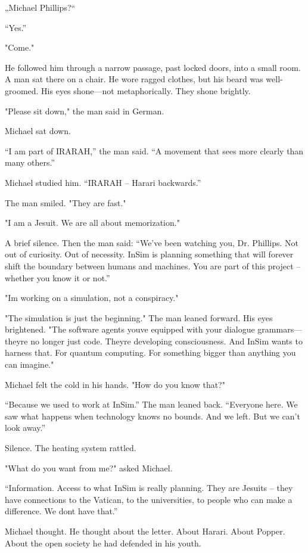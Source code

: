 \documentclass[
]{article}
\begin{document}
„Michael Phillips?{\kern0pt}``

``Yes.''

"Come."

He followed him through a narrow passage, past locked doors, into a small room. A man sat there on a chair. He wore ragged clothes, but his beard was well-groomed. His eyes shone---not metaphorically. They shone brightly.

"Please sit down," the man said in German.

Michael sat down.

``I am part of IRARAH,'' the man said. ``A movement that sees more clearly than many others.''

Michael studied him. ``IRARAH -- Harari backwards.''

The man smiled. "They are fast."

"I am a Jesuit. We are all about memorization."

A brief silence. Then the man said: ``We've been watching you, Dr. Phillips. Not out of curiosity. Out of necessity. InSim is planning something that will forever shift the boundary between humans and machines. You are part of this project -- whether you know it or not.''

"I\textquotesingle m working on a simulation, not a conspiracy."

"The simulation is just the beginning." The man leaned forward. His eyes brightened. "The software agents you\textquotesingle ve equipped with your dialogue grammars---they\textquotesingle re no longer just code. They\textquotesingle re developing consciousness. And InSim wants to harness that. For quantum computing. For something bigger than anything you can imagine."

Michael felt the cold in his hands. "How do you know that?"

``Because we used to work at InSim.'' The man leaned back. ``Everyone here. We saw what happens when technology knows no bounds. And we left. But we can't look away.''

Silence. The heating system rattled.

"What do you want from me?" asked Michael.

``Information. Access to what InSim is really planning. They are Jesuits -- they have connections to the Vatican, to the universities, to people who can make a difference. We don\textquotesingle t have that.''

Michael thought. He thought about the letter. About Harari. About Popper. About the open society he had defended in his youth.
\end{document}
